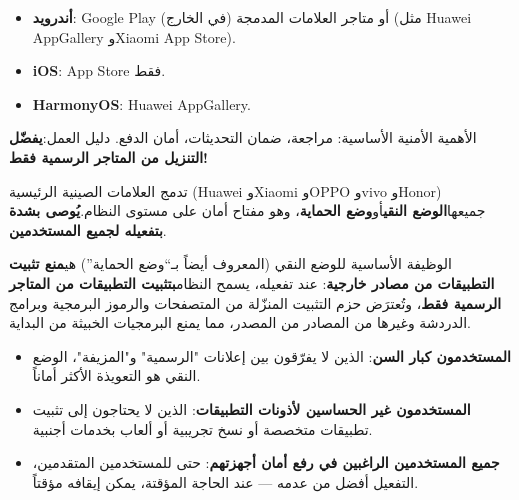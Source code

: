 


\begin{itemize}
  \item \textbf{أندرويد}: Google Play (في الخارج) أو متاجر العلامات المدمجة (مثل Huawei AppGallery وXiaomi App Store).
  \item \textbf{iOS}: App Store فقط.
  \item \textbf{HarmonyOS}: Huawei AppGallery.
\end{itemize}

الأهمية الأمنية الأساسية: مراجعة، ضمان التحديثات، أمان الدفع. دليل العمل:\textbf{يفضّل التنزيل من المتاجر الرسمية فقط!}


تدمج العلامات الصينية الرئيسية (Huawei وXiaomi وOPPO وvivo وHonor) جميعها\textbf{الوضع النقي}أو\textbf{وضع الحماية}، وهو مفتاح أمان على مستوى النظام.\textbf{يُوصى بشدة بتفعيله لجميع المستخدمين}.


الوظيفة الأساسية للوضع النقي (المعروف أيضاً بـ“وضع الحماية”) هي\textbf{منع تثبيت التطبيقات من مصادر خارجية}: عند تفعيله، يسمح النظام\textbf{بتثبيت التطبيقات من المتاجر الرسمية فقط}، وتُعترَض حزم التثبيت المنزّلة من المتصفحات والرموز البرمجية وبرامج الدردشة وغيرها من المصادر من المصدر، مما يمنع البرمجيات الخبيثة من البداية.


\begin{itemize}
  \item \textbf{المستخدمون كبار السن}: الذين لا يفرّقون بين إعلانات "الرسمية" و"المزيفة"، الوضع النقي هو التعويذة الأكثر أماناً.
  \item \textbf{المستخدمون غير الحساسين لأذونات التطبيقات}: الذين لا يحتاجون إلى تثبيت تطبيقات متخصصة أو نسخ تجريبية أو ألعاب بخدمات أجنبية.
  \item \textbf{جميع المستخدمين الراغبين في رفع أمان أجهزتهم}: حتى للمستخدمين المتقدمين، التفعيل أفضل من عدمه — عند الحاجة المؤقتة، يمكن إيقافه مؤقتاً.
\end{itemize}

